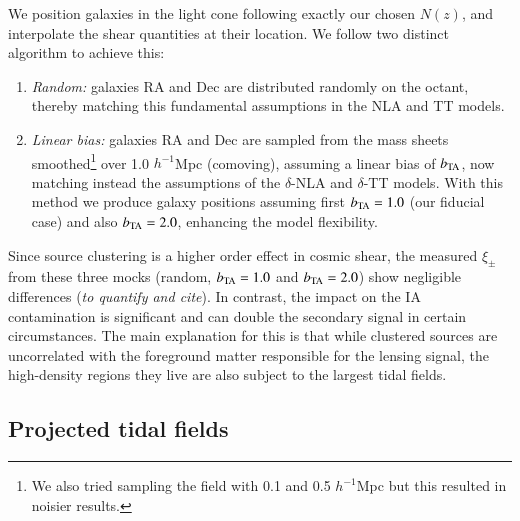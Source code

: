 \documentclass[useAMS,usenatbib]{mn2e}
\begin{document}
We position galaxies in the light cone following exactly our chosen $N(z)$, and interpolate the shear quantities at their location. We follow two distinct algorithm to achieve this:
\begin{enumerate}
\item {\it Random:} galaxies RA and Dec are distributed randomly on the octant, thereby matching this fundamental assumptions in the NLA and TT models. 
\item {\it Linear bias:} galaxies RA and Dec are sampled from the mass sheets smoothed\footnote{We also tried sampling the field with 0.1 and 0.5 $h^{-1}$Mpc but this resulted in noisier results.} over 1.0 $h^{-1}$Mpc (comoving), assuming a linear bias of $b_{\rm TA}$, now matching instead the assumptions of the $\delta$-NLA and $\delta$-TT models. With this method we produce galaxy positions assuming first $b_{\rm TA}=1.0$ (our fiducial case) and also $b_{\rm TA}=2.0$, enhancing the  model flexibility. 
\end{enumerate}

Since source clustering is a higher order effect in cosmic shear, the measured $\xi_{\pm}$ from these three mocks (random, $b_{\rm TA}=1.0$ and $b_{\rm TA}=2.0$) show negligible differences ({\it to quantify and cite}).
In contrast, the impact on the IA contamination is significant and can double the secondary signal in certain circumstances. The main explanation for this is that while clustered sources are uncorrelated with the foreground matter responsible for the lensing signal, the high-density regions they live are also subject to the largest tidal fields. 

\subsection{Projected tidal fields}
\label{subsec:IA_sims}
\end{document}
